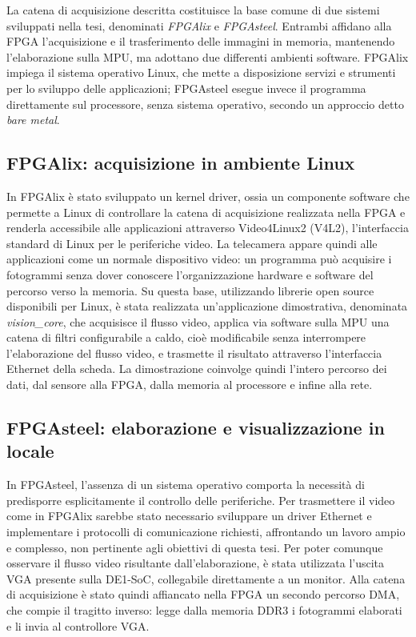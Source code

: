 La catena di acquisizione descritta costituisce la base comune di due sistemi sviluppati nella tesi, denominati \emph{FPGAlix} e \emph{FPGAsteel}. Entrambi affidano alla FPGA l'acquisizione e il trasferimento delle immagini in memoria, mantenendo l'elaborazione sulla MPU, ma adottano due differenti ambienti software. FPGAlix impiega il sistema operativo Linux, che mette a disposizione servizi e strumenti per lo sviluppo delle applicazioni; FPGAsteel esegue invece il programma direttamente sul processore, senza sistema operativo, secondo un approccio detto \emph{bare metal}.

\subsection{FPGAlix: acquisizione in ambiente Linux}

In FPGAlix è stato sviluppato un kernel driver, ossia un componente software che permette a Linux di controllare la catena di acquisizione realizzata nella FPGA e renderla accessibile alle applicazioni attraverso Video4Linux2 (V4L2), l'interfaccia standard di Linux per le periferiche video. La telecamera appare quindi alle applicazioni come un normale dispositivo video: un programma può acquisire i fotogrammi senza dover conoscere l'organizzazione hardware e software del percorso verso la memoria. Su questa base, utilizzando librerie open source disponibili per Linux, è stata realizzata un'applicazione dimostrativa, denominata \emph{vision\_core}, che acquisisce il flusso video, applica via software sulla MPU una catena di filtri configurabile a caldo, cioè modificabile senza interrompere l'elaborazione del flusso video, e trasmette il risultato attraverso l'interfaccia Ethernet della scheda. La dimostrazione coinvolge quindi l'intero percorso dei dati, dal sensore alla FPGA, dalla memoria al processore e infine alla rete.

\subsection{FPGAsteel: elaborazione e visualizzazione in locale}

In FPGAsteel, l'assenza di un sistema operativo comporta la necessità di predisporre esplicitamente il controllo delle periferiche. Per trasmettere il video come in FPGAlix sarebbe stato necessario sviluppare un driver Ethernet e implementare i protocolli di comunicazione richiesti, affrontando un lavoro ampio e complesso, non pertinente agli obiettivi di questa tesi. Per poter comunque osservare il flusso video risultante dall'elaborazione, è stata utilizzata l'uscita VGA presente sulla DE1-SoC, collegabile direttamente a un monitor. Alla catena di acquisizione è stato quindi affiancato nella FPGA un secondo percorso DMA, che compie il tragitto inverso: legge dalla memoria DDR3 i fotogrammi elaborati e li invia al controllore VGA.

